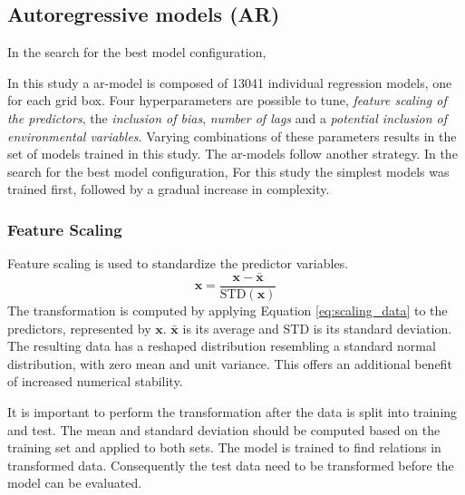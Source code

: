 \subsection{Autoregressive models (AR)}
In the search for the best model configuration, 



In this study a \acrshort{ar}-model is composed of 13041 individual regression models, one for each grid box. Four hyperparameters are possible to tune, \textit{feature scaling of the predictors}, the \textit{inclusion of bias}, \textit{number of lags} and a \textit{potential inclusion of environmental variables}. Varying combinations of these parameters results in the set of models trained in this study. 
The \acrshort{ar}-models follow another strategy.
In the search for the best model configuration,  
For this study the simplest models was trained first, followed by a gradual increase in complexity.


\subsubsection{Feature Scaling} \label{sec:scaling_predictors}
Feature scaling is used to standardize the predictor variables.
\begin{equation} \label{eq:scaling_data}
    \mathbf{x} = \frac{\mathbf{x} - \bar{\mathbf{x}}}{\text{STD}(\mathbf{x})}
\end{equation}
The transformation is computed by applying Equation \eqref{eq:scaling_data} to the predictors, represented by $\mathbf{x}$. $\bar{\mathbf{x}}$ is its average and STD is its standard deviation. The resulting data has a reshaped distribution resembling a standard normal distribution, with zero mean and unit variance. This offers an additional benefit of increased numerical stability. %

It is important to perform the transformation after the data is split into training and test. The mean and standard deviation should be computed based on the training set and applied to both sets. The model is trained to find relations in transformed data. Consequently the test data need to be transformed before the model can be evaluated. 

